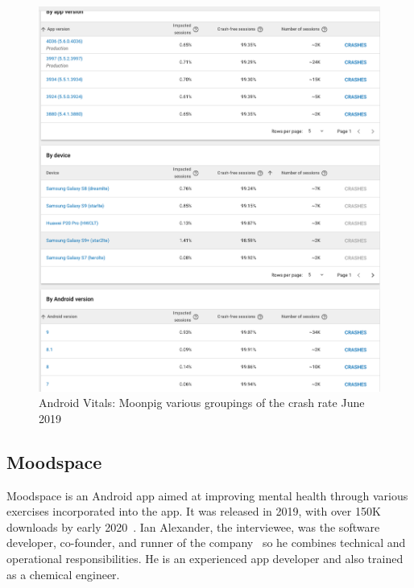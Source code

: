 \begin{figure}
    \centering
    \includegraphics[width=13cm]{images/android-vitals-screenshots/moonpig/Screenshot 2019-06-10 at 15.41.23.png}
    \caption{Android Vitals: Moonpig various groupings of the crash rate  June 2019}
    \label{fig:av-moonpig-crash-rate-groupings}
\end{figure}

\subsection{Moodspace}
Moodspace is an Android app aimed at improving mental health through various exercises incorporated into the app. It was released in 2019, with over 150K downloads by early 2020~\citep{objectbox2020_moodspace_interview}. Ian Alexander, the interviewee, was the software developer, co-founder, and runner of the company~\citep{objectbox2020_moodspace_interview} so he combines technical and operational responsibilities. He is an experienced app developer and also trained as a chemical engineer.  %


